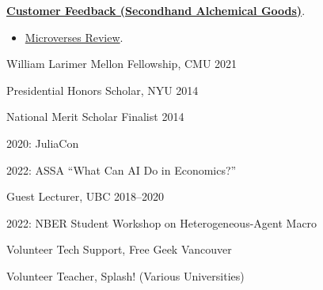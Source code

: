 \documentclass[12pt,article,oneside]{memoir}   %
\begin{document}
\textbf{\href{https://dailysciencefiction.com/fantasy/fantasy/arnav-sood/customer-feedback-secondhand-alchemical-goods}{Customer Feedback (Secondhand Alchemical Goods)}}. 
\begin{itemize}
  \setlength{\leftskip}{1cm} \item  \href{https://microverses.net/archives/250}{Microverses Review}.
\end{itemize}


{\vskip 0.1in}
\bigskip

\setlength{\leftskip}{0cm}

\vspace*{-0.01in} William Larimer Mellon Fellowship, CMU \hfill 2021\vspace{0.1in}

Presidential Honors Scholar, NYU \hfill 2014\vspace{0.1 in}

National Merit Scholar Finalist \hfill 2014

{\vskip 0.1in}
\bigskip

\setlength{\leftskip}{0cm}

\vspace*{-0.02in} 2020: JuliaCon \vspace{0.1in}

2022: ASSA ``What Can AI Do in Economics?''

{\vskip 0.1in}
\bigskip


\setlength{\leftskip}{0cm}

 Guest Lecturer, UBC \hfill 2018--2020

{\vskip 0.1in}
\bigskip

\setlength{\leftskip}{0cm}

2022: NBER Student Workshop on Heterogeneous-Agent Macro 

{\vskip 0.1in}
\bigskip


\setlength{\leftskip}{0cm}

Volunteer Tech Support, Free Geek Vancouver \vspace{0.1in}

Volunteer Teacher, Splash! (Various Universities)
\end{document}
